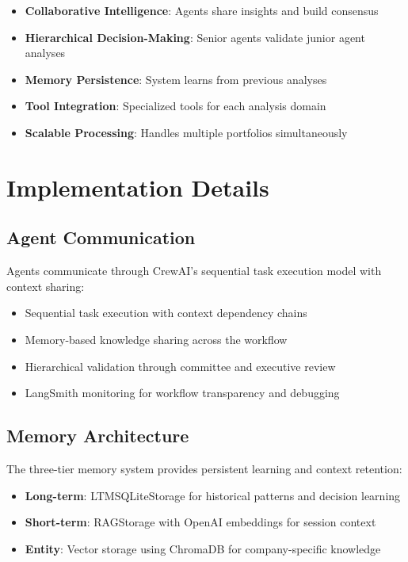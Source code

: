 \documentclass[11pt,a4paper]{article}
\begin{document}
\begin{itemize}[itemsep=0.5em]
    \item \textbf{Collaborative Intelligence}: Agents share insights and build consensus
    \item \textbf{Hierarchical Decision-Making}: Senior agents validate junior agent analyses
    \item \textbf{Memory Persistence}: System learns from previous analyses
    \item \textbf{Tool Integration}: Specialized tools for each analysis domain
    \item \textbf{Scalable Processing}: Handles multiple portfolios simultaneously
\end{itemize}

\section{Implementation Details}

\subsection{Agent Communication}
Agents communicate through CrewAI's sequential task execution model with context sharing:
\begin{itemize}
    \item Sequential task execution with context dependency chains
    \item Memory-based knowledge sharing across the workflow
    \item Hierarchical validation through committee and executive review
    \item LangSmith monitoring for workflow transparency and debugging
\end{itemize}

\subsection{Memory Architecture}
The three-tier memory system provides persistent learning and context retention:
\begin{itemize}
    \item \textbf{Long-term}: LTMSQLiteStorage for historical patterns and decision learning
    \item \textbf{Short-term}: RAGStorage with OpenAI embeddings for session context
    \item \textbf{Entity}: Vector storage using ChromaDB for company-specific knowledge
\end{itemize}
\end{document}
